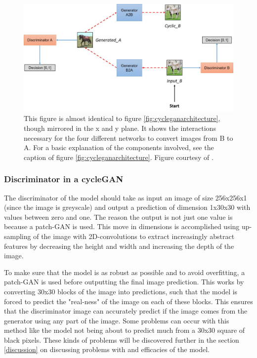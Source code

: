 \documentclass[12pt, fleqn, titlepage]{article}
\begin{document}
\begin{figure}[H]
	\centering
	\includegraphics[width=0.7\linewidth]{imgs/cyclegan_architecture2}
	\caption{This figure is almost identical to figure \ref{fig:cycleganarchitecture}, though mirrored in the x and y plane. It shows the interactions necessary for the four different networks to convert images from B to A. For a basic explanation of the components involved, see the caption of figure \ref{fig:cycleganarchitecture}. Figure courtesy of \cite{model_architecture}.}
	\label{fig:cycleganarchitecture2}
\end{figure}


\subsubsection{Discriminator in a cycleGAN}
The discriminator of the model should take as input an image of size 256x256x1 (since the image is greyscale) and output a prediction of dimension 1x30x30 with values between zero and one. The reason the output is not just one value is because a patch-GAN is used. This move in dimensions is accomplished using up-sampling of the image with 2D-convolutions to extract increasingly abstract features by decreasing the height and width and increasing the depth of the image.

To make sure that the model is as robust as possible and to avoid overfitting, a patch-GAN is used before outputting the final image prediction. This works by converting 30x30 blocks of the image into predictions, such that the model is forced to predict the "real-ness" of the image on each of these blocks. This ensures that the discriminator image can accurately predict if the image comes from the generator using any part of the image. Some problems can occur with this method like the model not being about to predict much from a 30x30 square of black pixels. These kinds of problems will be discovered further in the section \ref{discussion} on discussing problems with and efficacies of the model.
\end{document}
